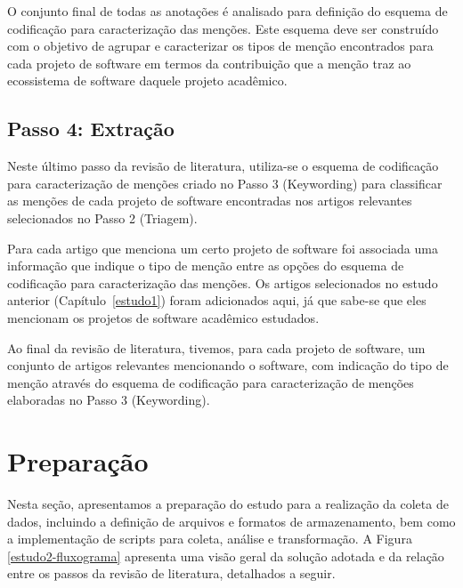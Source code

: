 O conjunto final de todas as anotações é analisado
para definição do esquema de codificação para caracterização das menções. 
Este esquema deve ser construído com o objetivo de agrupar e caracterizar os tipos
de menção encontrados para cada projeto de software em termos da contribuição
que a menção traz ao ecossistema de software daquele projeto acadêmico.

\subsection{Passo 4: Extração}

Neste último passo da revisão de literatura, utiliza-se o esquema de codificação
para caracterização de menções criado no Passo 3 (Keywording) para classificar as
menções de cada projeto de software encontradas nos artigos relevantes
selecionados no Passo 2 (Triagem).

Para cada artigo que menciona um certo projeto de software foi associada uma
informação que indique o tipo de menção entre as opções do esquema de
codificação para caracterização das menções. Os artigos selecionados no estudo
anterior (Capítulo~\ref{estudo1}) foram adicionados aqui, já que
sabe-se que eles mencionam os projetos de software acadêmico estudados.

Ao final da revisão de literatura, tivemos, para cada projeto de software, um
conjunto de artigos relevantes mencionando o software, com indicação do tipo de menção
através do esquema de codificação para caracterização de menções elaboradas no Passo 3 (Keywording).


\section{Preparação} \label{estudo2:preparacao} %

Nesta seção, apresentamos a preparação do estudo para a realização da coleta de
dados, incluindo a definição de arquivos e formatos de armazenamento, bem como
a implementação de scripts para coleta, análise e transformação.
A Figura \ref{estudo2-fluxograma} apresenta uma visão geral da solução adotada
e da relação entre os passos da revisão de literatura, detalhados a seguir.

